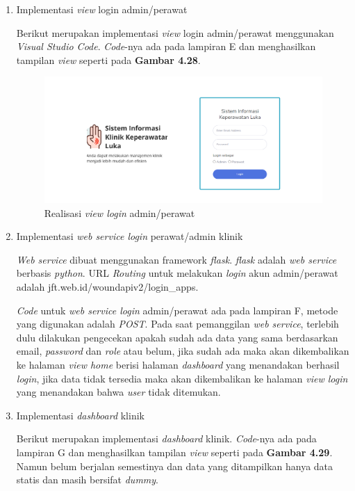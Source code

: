 \begin{enumerate}
	
	\item Implementasi \emph{view} login admin/perawat
	
	Berikut merupakan implementasi \emph{view} login admin/perawat menggunakan \emph{Visual Studio Code}. \emph{Code}-nya ada pada lampiran E dan menghasilkan tampilan \emph{view} seperti pada \textbf{Gambar 4.28}.
	
	\begin{figure}[H]
		\centering
		\includegraphics[width=14cm]{gambar/login_view.png}
		\caption{Realisasi \emph{view login} admin/perawat} 
		\label{Gambar:usecaseadminjurnalpertama}
	\end{figure}
	
	\item Implementasi \emph{web service login} perawat/admin klinik
	
	\emph{Web service} dibuat menggunakan framework \emph{flask}. \emph{flask} adalah \emph{web service} berbasis \emph{python}. URL \emph{Routing} untuk melakukan \emph{login} akun admin/perawat adalah jft.web.id/woundapiv2/login\_apps.
	
	\emph{Code} untuk \emph{web service login} admin/perawat ada pada lampiran F, metode yang digunakan adalah \emph{POST}. Pada saat pemanggilan \emph{web service}, terlebih dulu dilakukan pengecekan apakah sudah ada data yang sama berdasarkan email, \emph{password} dan \emph{role} atau belum, jika sudah ada maka akan dikembalikan ke halaman \emph{view home} berisi halaman \emph{dashboard} yang menandakan berhasil \emph{login}, jika data tidak tersedia maka akan dikembalikan ke halaman \emph{view login} yang menandakan bahwa \emph{user} tidak ditemukan.
	
	\item Implementasi \emph{dashboard} klinik
	
	Berikut merupakan implementasi \emph{dashboard} klinik. \emph{Code}-nya ada pada lampiran G dan menghasilkan tampilan \emph{view} seperti pada \textbf{Gambar 4.29}. Namun belum berjalan semestinya dan data yang ditampilkan hanya data statis dan masih bersifat \emph{dummy}.
	

\end{enumerate}
